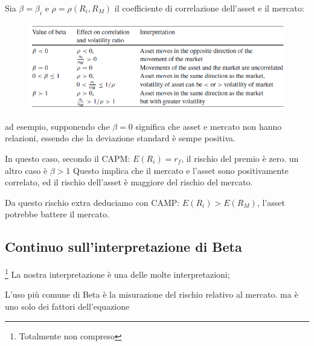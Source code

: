\documentclass[a4paper,11pt]{report}
\begin{document}
{	Sia $\beta=\beta_i$ e $\rho=\rho(R_i,R_M)$ il coefficiente di correlazione dell'asset e il mercato:
\begin{figure}[h]
  \includegraphics[width=\linewidth]{MeaningOfBeta.png}
  \label{fig:beta}
\end{figure}
	ad esempio, supponendo che \textbf{ $\beta=0$} significa che asset e mercato non hanno relazioni,\newline
	essendo che  la deviazione standard è sempe positiva.

	In questo caso, secondo il CAPM: $E(R_i)=r_f$, il rischio del premio è zero. \newline
	 un altro caso è $\beta > 1$ \newline
	Questo implica che il mercato e l'asset sono positivamente correlato, ed il rischio dell'asset è maggiore del rischio del mercato.

	Da questo rischio extra deduciamo con CAMP: $E(R_i)>E(R_M)$, l'asset potrebbe battere il mercato.\newline
\subsection{Continuo sull'interpretazione di Beta} \footnote{Totalmente non compreso}
	La nostra interpretazione è una delle molte interpretazioni;

	L'uso più comune di Beta è la misurazione del rischio relativo al mercato. ma è uno solo dei fattori dell'equazione \newline %
}
\end{document}
